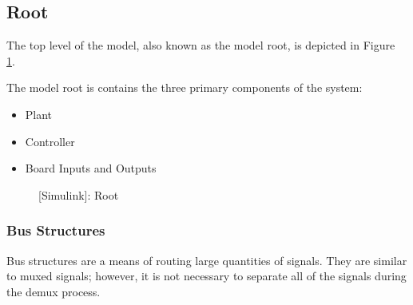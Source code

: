 \documentclass[crop=false,float=true,class=scrreprt]{standalone}
\begin{document}
\subsection{Root}
\label{SEC:testPlatform:simulink:root}

The top level of the model, also known as the model root,
is depicted in Figure~%
\ref{FIG:testPlatform:simulink:root}.

The model root is contains the three primary components of the system:

\begin{itemize}[leftmargin=*,itemsep=-1em]

\item Plant

\item Controller

\item Board Inputs and Outputs

\end{itemize}




\clearpage



\begin{landscape}
\begin{figure}[H]%
\centering%
\begin{minipage}[c][0.995\textheight][c]{0.995\linewidth}%
\centering%
%
\caption[{[Simulink]: Root}]%
        {{[Simulink]: Root%
          \label{FIG:testPlatform:simulink:root}%
        }}%
\end{minipage}%
\end{figure}
\end{landscape}




\clearpage




\subsubsection{Bus Structures}
\label{SEC:testPlatform:simulink:root:bus}

Bus structures are a means of routing large quantities of signals.
They are similar to muxed signals; however, 
it is not necessary to separate all of the signals during the demux process.
\end{document}
